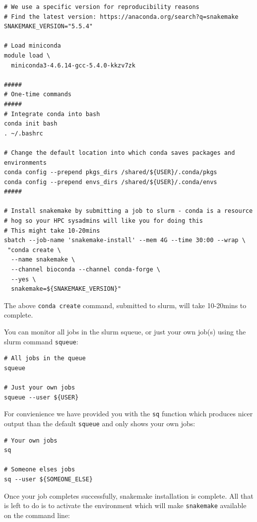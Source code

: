 \begin{steps}
\begin{lstlisting}
# We use a specific version for reproducibility reasons
# Find the latest version: https://anaconda.org/search?q=snakemake
SNAKEMAKE_VERSION="5.5.4"

# Load miniconda
module load \
  miniconda3-4.6.14-gcc-5.4.0-kkzv7zk

#####
# One-time commands
#####
# Integrate conda into bash
conda init bash
. ~/.bashrc

# Change the default location into which conda saves packages and environments
conda config --prepend pkgs_dirs /shared/${USER}/.conda/pkgs
conda config --prepend envs_dirs /shared/${USER}/.conda/envs
#####

# Install snakemake by submitting a job to slurm - conda is a resource
# hog so your HPC sysadmins will like you for doing this
# This might take 10-20mins
sbatch --job-name 'snakemake-install' --mem 4G --time 30:00 --wrap \
 "conda create \
  --name snakemake \
  --channel bioconda --channel conda-forge \
  --yes \
  snakemake=${SNAKEMAKE_VERSION}"
\end{lstlisting}

The above \texttt{conda create} command, submitted to slurm, will take 10-20mins to complete. 

\end{steps}

\begin{note}

You can monitor all jobs in the slurm squeue, or just your own job(s) using the slurm command \texttt{squeue}:

\begin{lstlisting}
# All jobs in the queue
squeue

# Just your own jobs
squeue --user ${USER}
\end{lstlisting}

For convienience we have provided you with the \texttt{sq} function which produces nicer output than the default \texttt{squeue} and only shows your own jobs:

\begin{lstlisting}
# Your own jobs
sq

# Someone elses jobs
sq --user ${SOMEONE_ELSE}
\end{lstlisting}

\end{note}

Once your job completes successfully, snakemake installation is complete. All that is left to do is to
activate the environment which will make \texttt{snakemake} available on the command line:

